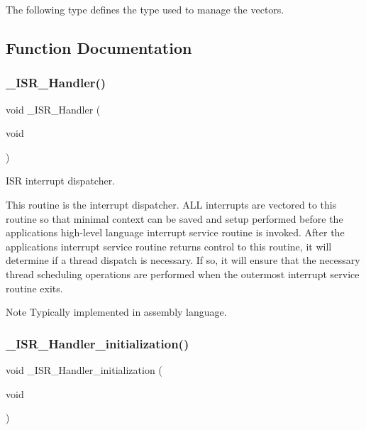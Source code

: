 The following type defines the type used to manage the vectors. 

\subsection{Function Documentation}
\mbox{\label{group__RTEMSScoreISR_ga559fbd0c5a6dca57b0fe7a061fe96b3f}} 
\subsubsection{\texorpdfstring{\_ISR\_Handler()}{\_ISR\_Handler()}}
{\footnotesize\ttfamily void \+\_\+\+I\+S\+R\+\_\+\+Handler (\begin{DoxyParamCaption}\item[{void}]{ }\end{DoxyParamCaption})}



I\+SR interrupt dispatcher. 

This routine is the interrupt dispatcher. A\+LL interrupts are vectored to this routine so that minimal context can be saved and setup performed before the application\textquotesingle{}s high-\/level language interrupt service routine is invoked. After the application\textquotesingle{}s interrupt service routine returns control to this routine, it will determine if a thread dispatch is necessary. If so, it will ensure that the necessary thread scheduling operations are performed when the outermost interrupt service routine exits.

\begin{DoxyNote}{Note}
Typically implemented in assembly language. 
\end{DoxyNote}
\mbox{\label{group__RTEMSScoreISR_ga8be8e02047ef8c71112a4abd6fa441b7}} 
\subsubsection{\texorpdfstring{\_ISR\_Handler\_initialization()}{\_ISR\_Handler\_initialization()}}
{\footnotesize\ttfamily void \+\_\+\+I\+S\+R\+\_\+\+Handler\+\_\+initialization (\begin{DoxyParamCaption}\item[{void}]{ }\end{DoxyParamCaption})}



